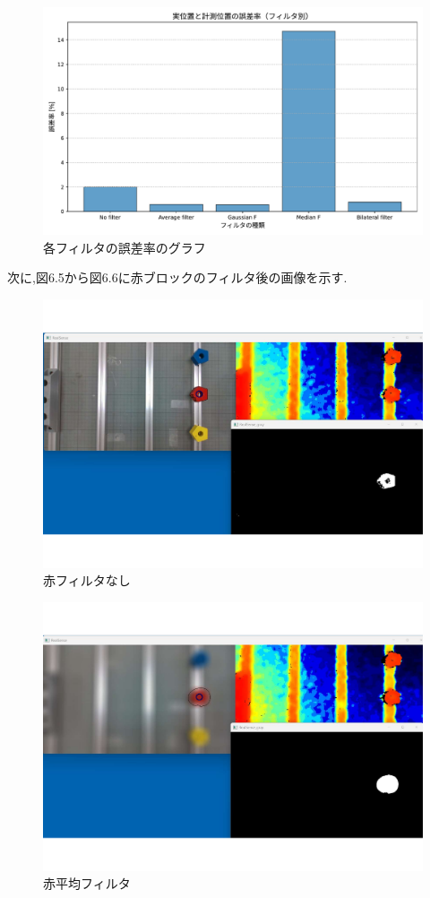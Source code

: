 \begin{figure}[H]
  \centering
  \includegraphics[scale=0.7]{sozai/gurafu.pdf}
  \caption{各フィルタの誤差率のグラフ}
\end{figure}

次に,図6.5から図6.6に赤ブロックのフィルタ後の画像を示す.

\begin{figure}[H]
  \centering
  \includegraphics[scale=0.5]{sozai/a.pdf}
  \caption{赤フィルタなし}
\end{figure}

\begin{figure}[H]
  \centering
  \includegraphics[scale=0.5]{sozai/b.pdf}
  \caption{赤平均フィルタ}
\end{figure}

